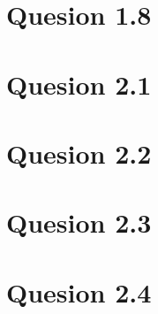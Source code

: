 \documentclass[a4paper,11pt,oneside]{article}
\begin{document}
\section{Quesion 1.8}

\section{Quesion 2.1}

\section{Quesion 2.2}

\section{Quesion 2.3}

\section{Quesion 2.4}
\end{document}
